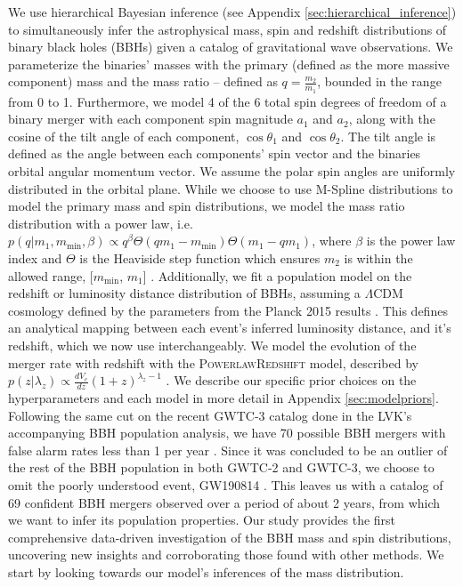 We use hierarchical Bayesian inference (see Appendix \ref{sec:hierarchical_inference}) to simultaneously infer the astrophysical mass, spin and redshift distributions of 
binary black holes (BBHs) given a catalog of gravitational wave observations. We parameterize the binaries' masses with the primary (defined as the more massive component) mass 
and the mass ratio -- defined as $q=\frac{m_2}{m_1}$, bounded in the range from 0 to 1. Furthermore, we model 4 of the 6 total 
spin degrees of freedom of a binary merger with each component spin magnitude $a_1$ and $a_2$, along with the cosine of the tilt angle of each component, 
$\cos{\theta_1}$ and $\cos{\theta_2}$. The tilt angle is defined as the angle between each components' spin vector and the binaries orbital angular momentum vector. 
We assume the polar spin angles are uniformly distributed in the orbital plane. While we choose to use M-Spline distributions to model the primary mass and spin distributions, we 
model the mass ratio distribution with a power law, i.e. $p(q | m_1, m_\mathrm{min}, \beta) \propto q^{\beta} \Theta(qm_1 - m_\mathrm{min}) \Theta(m_1 - qm_1)$, where $\beta$ is 
the power law index and $\Theta$ is the Heaviside step function which ensures $m_2$ is within the allowed range, [$m_\mathrm{min}$, $m_1$] \citep{Talbot_2018,o1o2_pop,o3a_pop}.
Additionally, we fit a population model on the redshift or luminosity distance distribution of BBHs, assuming a $\Lambda\mathrm{CDM}$ cosmology defined by the parameters 
from the Planck 2015 results \citep{Planck2015}. This defines an analytical mapping between each event's inferred luminosity distance, and it's redshift, which we now use interchangeably. 
We model the evolution of the merger rate with redshift with the \textsc{PowerlawRedshift} model, described by $p(z|\lambda_z)\propto \frac{dV_c}{dz}(1+z)^{\lambda_z-1}$ \citep{Fishbach_2018redshift}. 
We describe our specific prior choices on the hyperparameters and each model in more detail in Appendix \ref{sec:modelpriors}. Following the same cut on the recent GWTC-3 catalog done in the LVK's 
accompanying BBH population analysis, we have 70 possible BBH mergers with false alarm rates less than 1 per year \citep{GWTC3,o3b_astro_dist}. Since it was concluded to be an outlier of the rest of 
the BBH population in both GWTC-2 and GWTC-3, we choose to omit the poorly understood event, GW190814 \citep{190814disc,o3a_pop,o3b_astro_dist,Essick_2022}. This leaves us with 
a catalog of 69 confident BBH mergers observed over a period of about 2 years, from which we want to infer its population properties. Our study provides the first comprehensive 
data-driven investigation of the BBH mass and spin distributions, uncovering new insights and corroborating those found with other methods. 
We start by looking towards our model's inferences of the mass distribution.

